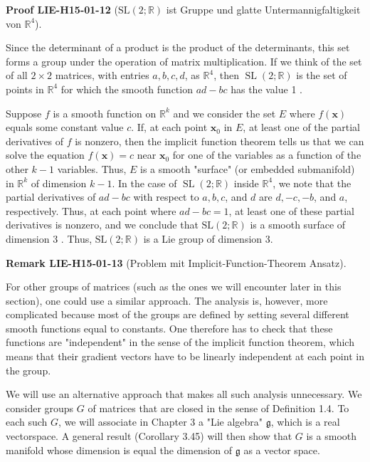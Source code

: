 \documentclass[10pt, letterpaper]{article}
\newcommand{\R}{\mathbb{R}}
\newcommand{\SL}{\mathrm{SL}}
\newcommand{\CustomHeading}[3]{%
  \par\medskip\noindent%
  \textbf{#1 #2} \textnormal{(#3)}.\enskip%
}
\newenvironment{REM}[2]{\begin{unitbox}\CustomHeading{Remark}{#1}{#2}}{\end{unitbox}}
\newenvironment{PROOF}[2]{\begin{unitbox}\CustomHeading{Proof}{#1}{#2}}{\end{unitbox}}
\begin{document}
\begin{PROOF}{LIE-H15-01-12}{$\SL(2 ; \mathbb{R})$ ist Gruppe und glatte Untermannigfaltigkeit von $\R^4$}
Since the determinant of a product is the product of the determinants, this set forms a group under the operation of matrix multiplication. If we think of the set of all $2 \times 2$ matrices, with entries $a, b, c, d$, as $\mathbb{R}^{4}$, then $\operatorname{SL}(2 ; \mathbb{R})$ is the set of points in $\mathbb{R}^{4}$ for which the smooth function $a d-b c$ has the value 1 .

Suppose $f$ is a smooth function on $\mathbb{R}^{k}$ and we consider the set $E$ where $f(\mathbf{x})$ equals some constant value $c$. If, at each point $\mathbf{x}_{0}$ in $E$, at least one of the partial derivatives of $f$ is nonzero, then the implicit function theorem tells us that we can solve the equation $f(\mathbf{x})=c$ near $\mathbf{x}_{0}$ for one of the variables as a function of the other $k-1$ variables. Thus, $E$ is a smooth "surface" (or embedded submanifold) in $\mathbb{R}^{k}$ of dimension $k-1$. In the case of $\operatorname{SL}(2 ; \mathbb{R})$ inside $\mathbb{R}^{4}$, we note that the partial derivatives of $a d-b c$ with respect to $a, b, c$, and $d$ are $d,-c,-b$, and $a$, respectively. Thus, at each point where $a d-b c=1$, at least one of these partial derivatives is nonzero, and we conclude that $\mathrm{SL}(2 ; \mathbb{R})$ is a smooth surface of dimension 3 . Thus, $\mathrm{SL}(2 ; \mathbb{R})$ is a Lie group of dimension 3.
\end{PROOF}

\begin{REM}{LIE-H15-01-13}{Problem mit Implicit-Function-Theorem Ansatz}
For other groups of matrices (such as the ones we will encounter later in this section), one could use a similar approach. The analysis is, however, more complicated because most of the groups are defined by setting several different smooth functions equal to constants. One therefore has to check that these functions are "independent" in the sense of the implicit function theorem, which means that their gradient vectors have to be linearly independent at each point in the group.
\end{REM}

We will use an alternative approach that makes all such analysis unnecessary. We consider groups $G$ of matrices that are closed in the sense of Definition 1.4. To each such $G$, we will associate in Chapter 3 a "Lie algebra" $\mathfrak{g}$, which is a real vectorspace. A general result (Corollary 3.45) will then show that $G$ is a smooth manifold whose dimension is equal the dimension of $\mathfrak{g}$ as a vector space.
\end{document}
